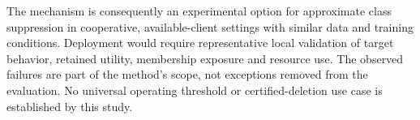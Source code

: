 The mechanism is consequently an experimental option for approximate
class suppression in cooperative, available-client settings with similar
data and training conditions. Deployment would require representative local
validation of target behavior, retained utility, membership exposure and
resource use. The observed failures are part of the method's scope, not
exceptions removed from the evaluation. No universal operating threshold or
certified-deletion use case is established by this study.
